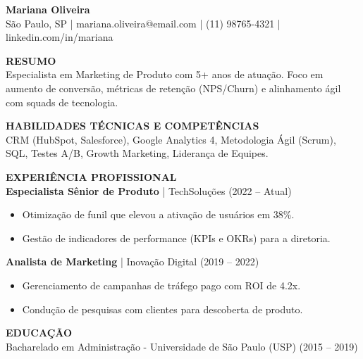\documentclass[10pt,letterpaper]{article}
\begin{document}
\begin{center}
  {\Large\bfseries Mariana Oliveira} \\[2pt]
  São Paulo, SP | mariana.oliveira@email.com | (11) 98765-4321 | linkedin.com/in/mariana
\end{center}

\vspace{4pt}
\textbf{RESUMO} \\
Especialista em Marketing de Produto com 5+ anos de atuação. Foco em aumento de conversão, métricas de retenção (NPS/Churn) e alinhamento ágil com squads de tecnologia.

\vspace{6pt}
\textbf{HABILIDADES TÉCNICAS E COMPETÊNCIAS} \\
CRM (HubSpot, Salesforce), Google Analytics 4, Metodologia Ágil (Scrum), SQL, Testes A/B, Growth Marketing, Liderança de Equipes.

\vspace{6pt}
\textbf{EXPERIÊNCIA PROFISSIONAL} \\[3pt]
\textbf{Especialista Sênior de Produto} | TechSoluções (2022 -- Atual)
\begin{itemize}
  \item Otimização de funil que elevou a ativação de usuários em 38\%.
  \item Gestão de indicadores de performance (KPIs e OKRs) para a diretoria.
\end{itemize}

\vspace{3pt}
\textbf{Analista de Marketing} | Inovação Digital (2019 -- 2022)
\begin{itemize}
  \item Gerenciamento de campanhas de tráfego pago com ROI de 4.2x.
  \item Condução de pesquisas com clientes para descoberta de produto.
\end{itemize}

\vspace{6pt}
\textbf{EDUCAÇÃO} \\
Bacharelado em Administração - Universidade de São Paulo (USP) (2015 -- 2019)
\end{document}
